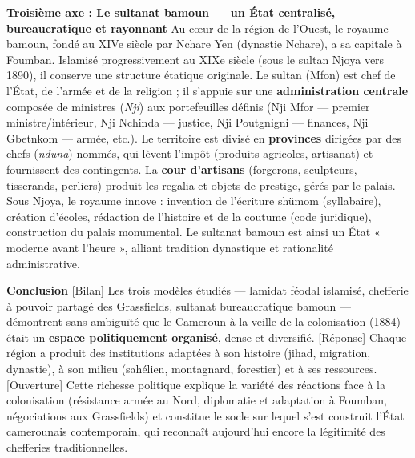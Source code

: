 \documentclass[11pt]{article}
\newcommand{\cle}[1]{{\popxbold\color{popdark}#1}}
\begin{document}
\begin{corrige}
\textbf{Troisième axe : Le sultanat bamoun — un État centralisé, bureaucratique et rayonnant}
Au cœur de la région de l'Ouest, le royaume bamoun, fondé au XIVe siècle par \cle{Nchare Yen} (dynastie Nchare), a sa capitale à \cle{Foumban}. Islamisé progressivement au XIXe siècle (sous le sultan Njoya vers 1890), il conserve une structure étatique originale. Le \cle{sultan} (Mfon) est chef de l'État, de l'armée et de la religion ; il s'appuie sur une \textbf{administration centrale} composée de ministres (\emph{Nji}) aux portefeuilles définis (Nji Mfor — premier ministre/intérieur, Nji Nchinda — justice, Nji Poutgnigni — finances, Nji Gbetnkom — armée, etc.). Le territoire est divisé en \textbf{provinces} dirigées par des chefs (\emph{nduna}) nommés, qui lèvent l'impôt (produits agricoles, artisanat) et fournissent des contingents. La \textbf{cour d'artisans} (forgerons, sculpteurs, tisserands, perliers) produit les regalia et objets de prestige, gérés par le palais. Sous Njoya, le royaume innove : invention de l'écriture \cle{shümom} (syllabaire), création d'écoles, rédaction de l'histoire et de la coutume (code juridique), construction du palais monumental. Le sultanat bamoun est ainsi un État « moderne avant l'heure », alliant tradition dynastique et rationalité administrative.

\textbf{Conclusion}
[Bilan] Les trois modèles étudiés — lamidat féodal islamisé, chefferie à pouvoir partagé des Grassfields, sultanat bureaucratique bamoun — démontrent sans ambiguïté que le Cameroun à la veille de la colonisation (1884) était un \textbf{espace politiquement organisé}, dense et diversifié. [Réponse] Chaque région a produit des institutions adaptées à son histoire (jihad, migration, dynastie), à son milieu (sahélien, montagnard, forestier) et à ses ressources. [Ouverture] Cette richesse politique explique la variété des réactions face à la colonisation (résistance armée au Nord, diplomatie et adaptation à Foumban, négociations aux Grassfields) et constitue le socle sur lequel s'est construit l'État camerounais contemporain, qui reconnaît aujourd'hui encore la légitimité des chefferies traditionnelles.
\end{corrige}
\end{document}
